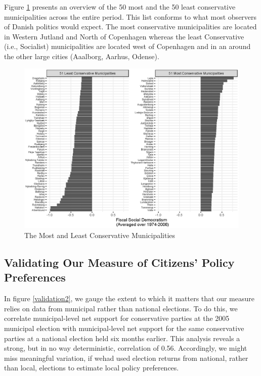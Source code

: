 \documentclass[a4paper,12pt]{article}
\begin{document}
Figure \ref{mostleast} presents an overview of the 50 most and the 50 least conservative municipalities across the entire period. This list conforms to what most observers of Danish politics would expect. The most conservative municipalities are located in Western Jutland and North of Copenhagen whereas the least Conservative (i.e., Socialist) municipalities are located west of Copenhagen and in an around the other large cities (Aaalborg, Aarhus, Odense). 

\begin{figure}
	\centering
	\includegraphics[width=1\textwidth]{conservatism_24092018.eps}
	\caption{The Most and Least Conservative Municipalities} \label{mostleast}
\end{figure}

\clearpage


\subsection{Validating Our Measure of Citizens' Policy Preferences} \label{validation}

\setcounter{table}{0}
\setcounter{figure}{0}


In figure \ref{validation2}, we gauge the extent to which it matters that our measure relies on data from municipal rather than national elections. To do this, we correlate  municipal-level net support for conservative parties at the 2005 municipal election with municipal-level net support for the same conservative parties at a national election held six months earlier. This analysis reveals a strong, but in no way deterministic, correlation of 0.56. Accordingly, we might miss meaningful variation, if wehad  used election returns from national, rather than local, elections to estimate local policy preferences.
\end{document}
